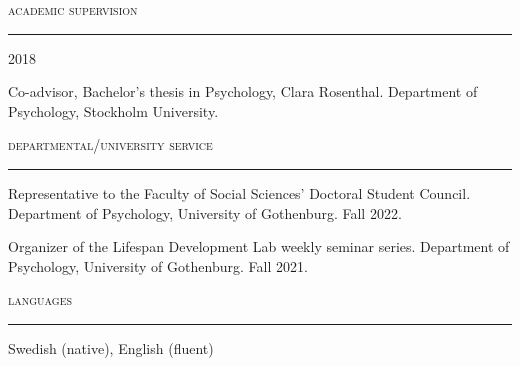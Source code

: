 \documentclass[11pt]{article}
\newcommand{\RR}{\textcolor{grayrule}{\rule[3mm]{\textwidth}{0.5pt}}}
\begin{document}
\textsc{\Large academic supervision}  \\
\vspace{-.3cm}\RR 

\begin{minipage}[t]{0.075\linewidth}
2018 
\end{minipage} 
\begin{minipage}[t]{0.92\linewidth}
Co-advisor, Bachelor's thesis in Psychology, Clara Rosenthal. Department of Psychology, Stockholm University. \vspace{\baselineskip}
\end{minipage}

\textsc{\Large departmental/university service} \\
\vspace{-.3cm}\RR 
\textbf{}


\begin{hangparas}{0.4in}{1}
Representative to the Faculty of Social Sciences’ Doctoral Student Council. Department of Psychology, University of Gothenburg. Fall 2022.

Organizer of the Lifespan Development Lab weekly seminar series. Department of Psychology, University of Gothenburg. Fall 2021.

\end{hangparas}

 \vspace{\baselineskip}





\textsc{\Large languages}\\
\vspace{-.3cm}\RR 

Swedish (native), English (fluent)
\end{document}
